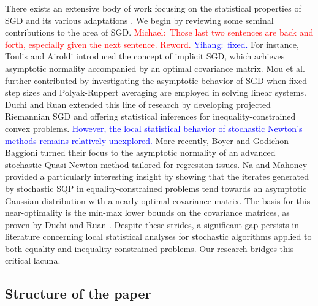 \documentclass[aos]{imsart}
\numberwithin{equation}{section}
\theoremstyle{plain}
\newcommand{\michael}[1]{\textcolor{red}{Michael:\ #1}}
\newcommand{\yihang}[1]{\textcolor{blue}{Yihang:\ #1}}
\begin{document}
There exists an extensive body of work focusing on the statistical properties of SGD and its various adaptations \cite{polyak1992acceleration, chen2020statistical}. 
We begin by reviewing some seminal contributions to the area of SGD. 
\michael{Those last two sentences are back and forth, especially given the next sentence. Reword.}
\yihang{fixed.}
For instance, Toulis and Airoldi \cite{toulis2017asymptotic} introduced the concept of implicit SGD, which achieves asymptotic normality accompanied by an optimal covariance matrix. Mou et al. \cite{mou2020linear} further contributed by investigating the asymptotic behavior of SGD when fixed step sizes and Polyak-Ruppert averaging are employed in solving linear systems.
Duchi and Ruan \cite{duchi2021asymptotic} extended this line of research by developing projected Riemannian SGD and offering statistical inferences for inequality-constrained convex problems. \textcolor{blue}{However, the local statistical behavior of stochastic Newton's methods remains relatively unexplored.}
More recently, Boyer and Godichon-Baggioni \cite{boyer2023asymptotic} turned their focus to the asymptotic normality of an advanced stochastic Quasi-Newton method tailored for regression issues.
Na and Mahoney \cite{na2022asymptotic} provided a particularly interesting insight by showing that the iterates generated by stochastic SQP in equality-constrained problems tend towards an asymptotic Gaussian distribution with a nearly optimal covariance matrix.
The basis for this near-optimality is the min-max lower bounds on the covariance matrices, as proven by Duchi and Ruan \cite{duchi2021asymptotic}. 
Despite these strides, a significant gap persists in literature concerning local statistical analyses for stochastic algorithms applied to both equality and inequality-constrained problems. 
Our research bridges this critical lacuna.


\subsection{Structure of the paper}
\end{document}
